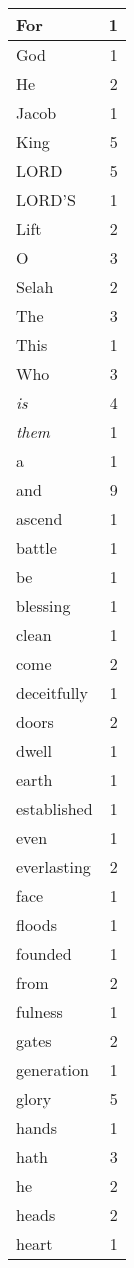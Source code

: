 \begin{center}
\begin{longtable}{l|r}
\hline \hline
\endlastfoot
For & 1 \\ \hline
God & 1 \\ \hline
He & 2 \\ \hline
Jacob & 1 \\ \hline
King & 5 \\ \hline
LORD & 5 \\ \hline
LORD'S & 1 \\ \hline
Lift & 2 \\ \hline
O & 3 \\ \hline
Selah & 2 \\ \hline
The & 3 \\ \hline
This & 1 \\ \hline
Who & 3 \\ \hline
\emph{is} & 4 \\ \hline
\emph{them} & 1 \\ \hline
a & 1 \\ \hline
and & 9 \\ \hline
ascend & 1 \\ \hline
battle & 1 \\ \hline
be & 1 \\ \hline
blessing & 1 \\ \hline
clean & 1 \\ \hline
come & 2 \\ \hline
deceitfully & 1 \\ \hline
doors & 2 \\ \hline
dwell & 1 \\ \hline
earth & 1 \\ \hline
established & 1 \\ \hline
even & 1 \\ \hline
everlasting & 2 \\ \hline
face & 1 \\ \hline
floods & 1 \\ \hline
founded & 1 \\ \hline
from & 2 \\ \hline
fulness & 1 \\ \hline
gates & 2 \\ \hline
generation & 1 \\ \hline
glory & 5 \\ \hline
hands & 1 \\ \hline
hath & 3 \\ \hline
he & 2 \\ \hline
heads & 2 \\ \hline
heart & 1 \\ \hline

\end{longtable}
\end{center}
